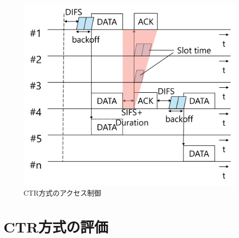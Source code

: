 \documentclass[a4paper,10pt]{ltjsarticle}
\begin{document}
\begin{figure}[H]
  \centering
  \includegraphics[width=\linewidth]{ctr_accsess.png} %
  \caption{CTR方式のアクセス制御}
  \label{fig:CTR方式のアクセス制御} %
\end{figure}
\section{CTR方式の評価}
\end{document}
